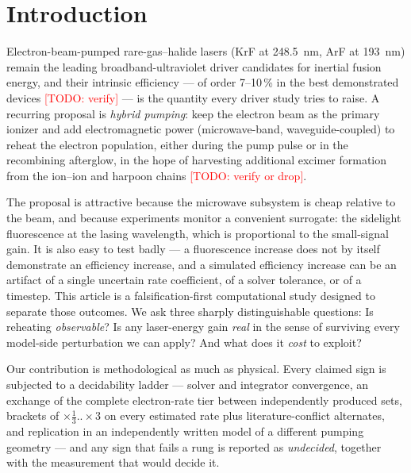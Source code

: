 \documentclass[aps,pra,preprint,longbibliography,nofootinbib]{revtex4-2}
\newcommand{\todo}[1]{\textcolor{red}{[TODO: #1]}}
\begin{document}
\maketitle

\section{Introduction}

Electron-beam-pumped rare-gas--halide lasers (KrF at 248.5~nm, ArF at
193~nm) remain the leading broadband-ultraviolet driver candidates for
inertial fusion energy, and their intrinsic efficiency --- of order
7--10\,\% in the best demonstrated devices
\cite{electra}\todo{verify} --- is the quantity every driver study
tries to raise. A recurring proposal is \emph{hybrid pumping}: keep the
electron beam as the primary ionizer and add electromagnetic power
(microwave-band, waveguide-coupled) to reheat the electron population,
either during the pump pulse or in the recombining afterglow, in the
hope of harvesting additional excimer formation from the ion--ion and
harpoon chains \cite{hybridconcept}\todo{verify or drop}.

The proposal is attractive because the microwave subsystem is cheap
relative to the beam, and because experiments monitor a convenient
surrogate: the sidelight fluorescence at the lasing wavelength, which
is proportional to the small-signal gain. It is also easy to test badly
--- a fluorescence increase does not by itself demonstrate an
efficiency increase, and a simulated efficiency increase can be an
artifact of a single uncertain rate coefficient, of a solver tolerance,
or of a timestep. This article is a falsification-first computational
study designed to separate those outcomes. We ask three sharply
distinguishable questions: Is reheating \emph{observable}? Is any
laser-energy gain \emph{real} in the sense of surviving every
model-side perturbation we can apply? And what does it \emph{cost} to
exploit?

Our contribution is methodological as much as physical. Every claimed
sign is subjected to a decidability ladder --- solver and integrator
convergence, an exchange of the complete electron-rate tier between
independently produced sets, brackets of $\times\tfrac13..\times3$ on
every estimated rate plus literature-conflict alternates, and
replication in an independently written model of a different pumping
geometry --- and any sign that fails a rung is reported as
\emph{undecided}, together with the measurement that would decide it.
\end{document}
